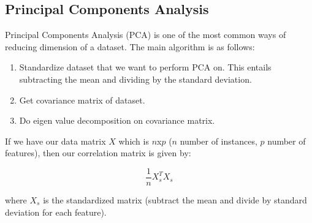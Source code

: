\subsection{Principal Components Analysis}

Principal Components Analysis (PCA) is one of the most common ways of reducing dimension of a dataset. The main algorithm is as follows:

\begin{enumerate}
\item Standardize dataset that we want to perform PCA on. This entails subtracting the mean and dividing by the standard deviation.

\item Get covariance matrix of dataset.

\item Do eigen value decomposition on covariance matrix.

\end{enumerate}


If we have our data matrix $X$ which is $n$x$p$ ($n$ number of instances, $p$ number of features), then our correlation matrix is given by:

\begin{equation}
\frac{1}{n}X_s^TX_s
\end{equation}

\noindent where $X_s$ is the standardized matrix (subtract the mean and divide by standard deviation for each feature). 